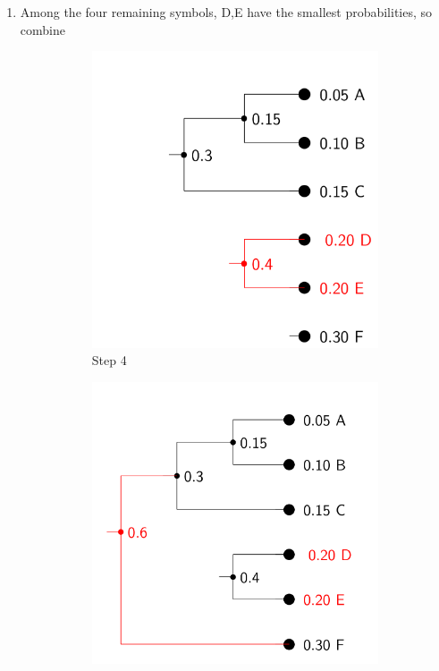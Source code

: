 \documentclass[24pt]{article}
\begin{document}
\begin{itemize}
\begin{enumerate}
\item Among the four remaining symbols, D,E have the smallest probabilities, so combine
\begin{figure}[h]
\begin{subfigure}[h]{0.3\linewidth}
  \includegraphics[width=\linewidth ]{Huff4.png}
  \caption{Step 4}
\end{subfigure}
\begin{subfigure}[h]{0.3\linewidth}
  \includegraphics[width=\linewidth ]{Huff5.png}

\end{subfigure}
\end{figure}
\end{enumerate}
\end{itemize}
\end{document}
